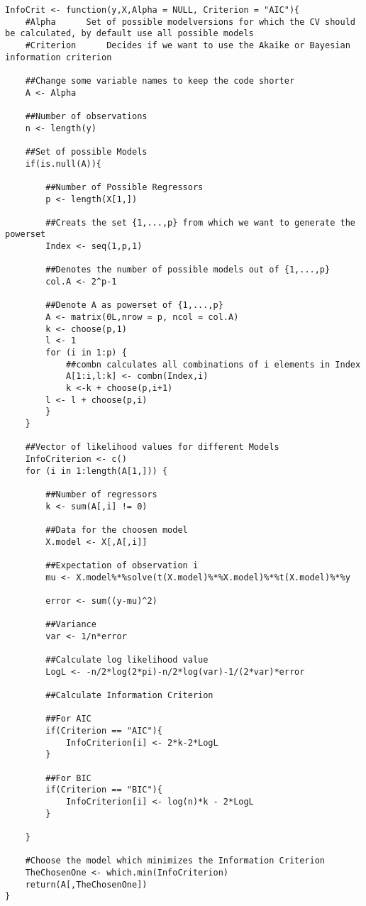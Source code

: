 \documentclass[Research_Module_ES.tex]{subfiles}
\begin{document}
\begin{lstlisting}[title={Akaike and Schwarz Information Criterion}]
InfoCrit <- function(y,X,Alpha = NULL, Criterion = "AIC"){
	#Alpha		Set of possible modelversions for which the CV should 		 be calculated, by default use all possible models
	#Criterion    	Decides if we want to use the Akaike or Bayesian 	     information criterion

	##Change some variable names to keep the code shorter
	A <- Alpha

	##Number of observations
	n <- length(y)

	##Set of possible Models
	if(is.null(A)){

		##Number of Possible Regressors
		p <- length(X[1,])

		##Creats the set {1,...,p} from which we want to generate the powerset
		Index <- seq(1,p,1)    

		##Denotes the number of possible models out of {1,...,p} 
		col.A <- 2^p-1     

		##Denote A as powerset of {1,...,p}
		A <- matrix(0L,nrow = p, ncol = col.A)      
		k <- choose(p,1)
		l <- 1
		for (i in 1:p) {
			##combn calculates all combinations of i elements in Index
			A[1:i,l:k] <- combn(Index,i)               
			k <-k + choose(p,i+1)
		l <- l + choose(p,i)
		}
	}

	##Vector of likelihood values for different Models
	InfoCriterion <- c()
	for (i in 1:length(A[1,])) {

		##Number of regressors
		k <- sum(A[,i] != 0)

		##Data for the choosen model
		X.model <- X[,A[,i]] 

		##Expectation of observation i
		mu <- X.model%*%solve(t(X.model)%*%X.model)%*%t(X.model)%*%y

		error <- sum((y-mu)^2)

		##Variance
		var <- 1/n*error

		##Calculate log likelihood value
		LogL <- -n/2*log(2*pi)-n/2*log(var)-1/(2*var)*error

		##Calculate Information Criterion

		##For AIC
		if(Criterion == "AIC"){
			InfoCriterion[i] <- 2*k-2*LogL
		}

		##For BIC
		if(Criterion == "BIC"){
			InfoCriterion[i] <- log(n)*k - 2*LogL
		}

	}

	#Choose the model which minimizes the Information Criterion
	TheChosenOne <- which.min(InfoCriterion)
	return(A[,TheChosenOne])
}
\end{lstlisting}
\end{document}
